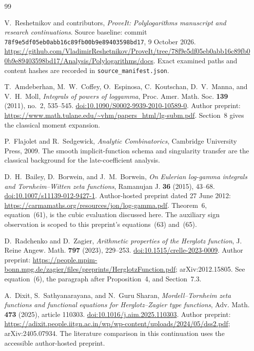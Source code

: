 \begin{thebibliography}{99}

V.~Reshetnikov and contributors,
\emph{ProveIt: Polylogarithms manuscript and research continuations}.
Source baseline: commit
\texttt{78f9e5df05eb0abb16c89fb00b9e89403598bd17}, 9 October 2026.
\url{https://github.com/VladimirReshetnikov/ProveIt/tree/78f9e5df05eb0abb16c89fb00b9e89403598bd17/Analysis/Polylogarithms/docs}.
Exact examined paths and content hashes are recorded in
\texttt{source\_manifest.json}.

T.~Amdeberhan, M.~W.~Coffey, O.~Espinosa, C.~Koutschan,
D.~V.~Manna, and V.~H.~Moll,
\emph{Integrals of powers of loggamma},
Proc. Amer. Math. Soc. \textbf{139} (2011), no.~2, 535--545.
\href{https://doi.org/10.1090/S0002-9939-2010-10589-0}
{doi:10.1090/S0002-9939-2010-10589-0}.
Author preprint:
\url{https://www.math.tulane.edu/~vhm/papers_html/lg-subm.pdf}.
Section~8 gives the classical moment expansion.

P.~Flajolet and R.~Sedgewick,
\emph{Analytic Combinatorics}, Cambridge University Press, 2009.
The smooth implicit-function schema and singularity transfer are the
classical background for the late-coefficient analysis.

D.~H.~Bailey, D.~Borwein, and J.~M.~Borwein,
\emph{On Eulerian log-gamma integrals and Tornheim--Witten zeta functions},
Ramanujan J. \textbf{36} (2015), 43--68.
\href{https://doi.org/10.1007/s11139-012-9427-1}
{doi:10.1007/s11139-012-9427-1}.
Author-hosted preprint dated 27 June 2012:
\url{https://carmamaths.org/resources/jon/log-gamma.pdf}.
Theorem~6, equation~(61), is the cubic evaluation discussed here.
The auxiliary sign observation is scoped to this preprint's
equations~(63) and~(65).

D.~Radchenko and D.~Zagier,
\emph{Arithmetic properties of the Herglotz function},
J. Reine Angew. Math. \textbf{797} (2023), 229--253.
\href{https://doi.org/10.1515/crelle-2023-0009}
{doi:10.1515/crelle-2023-0009}.
Author preprint:
\url{https://people.mpim-bonn.mpg.de/zagier/files/preprints/HerglotzFunction.pdf};
arXiv:2012.15805.
See equation~(6), the paragraph after Proposition~4, and Section~7.3.

A.~Dixit, S.~Sathyanarayana, and N.~Guru Sharan,
\emph{Mordell--Tornheim zeta functions and functional equations for
Herglotz--Zagier type functions},
Adv. Math. \textbf{473} (2025), article 110303.
\href{https://doi.org/10.1016/j.aim.2025.110303}
{doi:10.1016/j.aim.2025.110303}.
Author preprint:
\url{https://adixit.people.iitgn.ac.in/wp/wp-content/uploads/2024/05/dss2.pdf};
arXiv:2405.07934.
The literature comparison in this continuation uses the accessible
author-hosted preprint.


\end{thebibliography}
